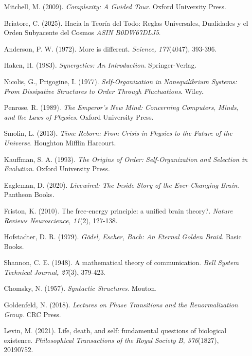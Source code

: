\documentclass{article}
\begin{document}
\newpage
\begin{thebibliography}{99}

Mitchell, M. (2009). \textit{Complexity: A Guided Tour}. Oxford University Press.

Briatore, C. (2025). Hacia la Teoría del Todo: Reglas Universales, Dualidades y el Orden Subyacente del Cosmos \textit{ASIN B0DW67DLJ5}.

Anderson, P. W. (1972). More is different. \textit{Science, 177}(4047), 393-396.

Haken, H. (1983). \textit{Synergetics: An Introduction}. Springer-Verlag.

Nicolis, G.,  Prigogine, I. (1977). \textit{Self-Organization in Nonequilibrium Systems: From Dissipative Structures to Order Through Fluctuations}. Wiley.

Penrose, R. (1989). \textit{The Emperor's New Mind: Concerning Computers, Minds, and the Laws of Physics}. Oxford University Press.

Smolin, L. (2013). \textit{Time Reborn: From Crisis in Physics to the Future of the Universe}. Houghton Mifflin Harcourt.

Kauffman, S. A. (1993). \textit{The Origins of Order: Self-Organization and Selection in Evolution}. Oxford University Press.

Eagleman, D. (2020). \textit{Livewired: The Inside Story of the Ever-Changing Brain}. Pantheon Books.

Friston, K. (2010). The free-energy principle: a unified brain theory?. \textit{Nature Reviews Neuroscience, 11}(2), 127-138.

Hofstadter, D. R. (1979). \textit{Gödel, Escher, Bach: An Eternal Golden Braid}. Basic Books.

Shannon, C. E. (1948). A mathematical theory of communication. \textit{Bell System Technical Journal, 27}(3), 379-423.

Chomsky, N. (1957). \textit{Syntactic Structures}. Mouton.

Goldenfeld, N. (2018). \textit{Lectures on Phase Transitions and the Renormalization Group}. CRC Press.

Levin, M. (2021). Life, death, and self: fundamental questions of biological existence. \textit{Philosophical Transactions of the Royal Society B, 376}(1827), 20190752.



\end{thebibliography}

\bigskip
\bigskip
\bigskip
\begin{center}
\end{center}
\end{document}
